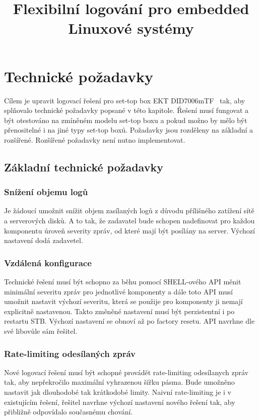 \documentclass[thesis=B,czech]{FITthesis}[2012/06/26]
\title{Flexibilní logování pro embedded Linuxové systémy}
\begin{document}
\begin{introduction}

\end{introduction}

\chapter{Technické požadavky}
Cílem je upravit logovací řešení pro set-top box EKT DID7006mTF~\cite{ekt7006} tak, aby splňovalo technické požadavky popsané v této kapitole. Řešení musí fungovat a být otestováno na zmíněném modelu set-top boxu a pokud možno by mělo být přenositelné i na jiné typy set-top boxů.
Požadavky jsou rozděleny na základní a rozšířené. Rozšířené požadavky není nutno implementovat.

\section{Základní technické požadavky}

\subsection{Snížení objemu logů}
Je žádoucí umožnit snížit objem zasílaných logů z důvodu přílišného zatížení sítě a serverových disků. A to tak, že zadavatel bude schopen nadefinovat pro každou komponentu úroveň severity zpráv, od které mají být posílány na server. Výchozí nastavení dodá zadavetel.

\subsection{Vzdálená konfigurace}
Technické řešení musí být schopno za běhu pomocí SHELL-ového API měnit minimální severitu zpráv pro jednotlivé komponenty a dále toto API musí umožnit nastavit výchozí severitu, která se použije pro komponenty ji nemají explicitně nastavenou. Takto změněné nastavení musí být perzistentní i po restartu STB. Výchozí nastavení se obnoví až po factory resetu. API navrhne dle své libovůle sám řešitel.

\subsection{Rate-limiting odesílaných zpráv}
Nové logovací řešení musí být schopné provádět rate-limiting odesílanych zpráv tak, aby nepřekročilo maximální vyhrazenou šířku pásma. Bude umožněno nastavit jak dlouhodobé tak krátkodobé limity. Naivní rate-limiting je i v existujícím řešení, řešitel navrhne výchozí nastavení nového řešení tak, aby přibližně odpovídalo současnému chování. 
\end{document}
